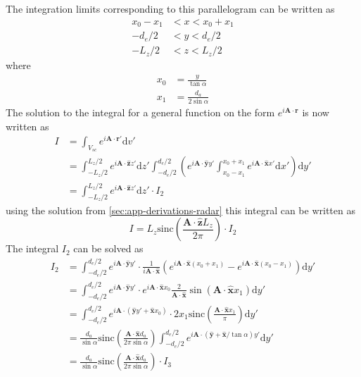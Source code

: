 \documentclass[11pt,twoside]{eitExjobb}
\begin{document}
	The integration limits corresponding to this parallelogram can be written as
	\begin{align*}
		x_0 - x_1 &< x < x_0 + x_1 \\
		-d_e/2 &< y < d_e/2 \\
		-L_z/2 &< z < L_z/2
	\end{align*}
	where
	\begin{align*}
		x_0 &= \frac{y}{\tan{\alpha}} \\
		x_1 &= \frac{d_a}{2\sin{\alpha}}
	\end{align*}
	The solution to the integral for a general function on the form $e^{i\bm{A} \cdot \bm{r}}$ is now written as
	\begin{equation*}
	\begin{split}
			I &= \int_{V_{sc}} e^{i\bm{A} \cdot \bm{r}'} \mathrm{d}v' \\
			&= \int_{-L_z/2}^{L_z/2} e^{i\bm{A} \cdot \bm{\hat{z}} z'} \mathrm{d}z'
			\int_{-d_e/2}^{d_e/2} \left( e^{i\bm{A} \cdot \bm{\hat{y}} y'}
			\int_{x_0-x_1}^{x_0+x_1} e^{i\bm{A} \cdot \bm{\hat{x}} x'} \mathrm{d}x' \right) \mathrm{d}y' \\
			&= \int_{-L_z/2}^{L_z/2} e^{i\bm{A} \cdot \bm{\hat{z}} z'} \mathrm{d}z' \cdot I_2
	\end{split}
	\end{equation*}
	using the solution from \ref{sec:app-derivations-radar}  this integral can be written as
	\begin{equation*}
		I = L_z \text{sinc}\left( \frac{\bm{A} \cdot \bm{\hat{z}} L_z}{2\pi} \right) \cdot I_2
	\end{equation*}
	The integral $I_2$ can be solved as
	\begin{equation*}
	\begin{split}
		I_2 &= \int_{-d_e/2}^{d_e/2} e^{i\bm{A} \cdot \bm{\hat{y}} y'}
		\cdot \frac{1}{i\bm{A} \cdot \bm{\hat{x}}}
		\left( e^{i\bm{A} \cdot \bm{\hat{x}} (x_0+x_1)} - e^{i\bm{A} \cdot \bm{\hat{x}} (x_0-x_1)}\right) \mathrm{d}y' \\
		&=\int_{-d_e/2}^{d_e/2} e^{i\bm{A} \cdot \bm{\hat{y}} y'}
		\cdot e^{i\bm{A} \cdot \bm{\hat{x}} x_0} \frac{2}{\bm{A} \cdot \bm{\hat{x}}} \sin(\bm{A} \cdot \bm{\hat{x}} x_1) \mathrm{d}y' \\
		&=\int_{-d_e/2}^{d_e/2} e^{i\bm{A} \cdot (\bm{\hat{y}} y'+ \bm{\hat{x}} x_0)}
		\cdot 2x_1 \text{sinc}\left( \frac{\bm{A} \cdot \bm{\hat{x}} x_1}{\pi} \right) \mathrm{d}y' \\
		&= \frac{d_a}{\sin{\alpha}} \text{sinc}\left( \frac{\bm{A} \cdot \bm{\hat{x}} d_a}{2\pi \sin{\alpha}} \right) \int_{-d_e/2}^{d_e/2} e^{i\bm{A} \cdot (\bm{\hat{y}} + \bm{\hat{x}}/\tan{\alpha}) y'} \mathrm{d}y' \\
		&= \frac{d_a}{\sin{\alpha}} \text{sinc}\left( \frac{\bm{A} \cdot \bm{\hat{x}} d_a}{2\pi \sin{\alpha}} \right) \cdot I_3
	\end{split}
	\end{equation*}
\end{document}
